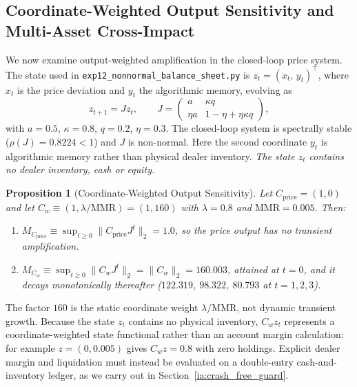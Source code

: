 \documentclass[12pt]{article}
\newtheorem{proposition}[theorem]{Proposition}
\theoremstyle{definition}
\theoremstyle{remark}
\begin{document}
\subsection{Coordinate-Weighted Output Sensitivity and Multi-Asset Cross-Impact}
\label{ia:nonnormal_decoupling}

We now examine output-weighted amplification in the closed-loop price system. The state used in \texttt{exp12\_nonnormal\_balance\_sheet.py} is $z_t=(x_t,\,y_t)^\top$, where $x_t$ is the price deviation and $y_t$ the algorithmic memory, evolving as
\begin{equation}
z_{t+1} = J z_t, \qquad J = \begin{pmatrix} a & \kappa q \\ \eta a & 1-\eta+\eta\kappa q \end{pmatrix},
\end{equation}
with $a=0.5$, $\kappa=0.8$, $q=0.2$, $\eta=0.3$. The closed-loop system is spectrally stable ($\rho(J)=0.8224<1$) and $J$ is non-normal. Here the second coordinate $y_t$ is algorithmic memory rather than physical dealer inventory. \emph{The state $z_t$ contains no dealer inventory, cash or equity.}

\begin{proposition}[Coordinate-Weighted Output Sensitivity]
\label{prop:balance_sheet_decoupling}
Let $C_{\mathrm{price}} = (1, 0)$ and let $C_w \equiv (1, \lambda/\mathrm{MMR}) = (1,160)$ with $\lambda=0.8$ and $\mathrm{MMR}=0.005$. Then:
\begin{enumerate}[label=(\roman*)]
\item $M_{C_{\mathrm{price}}} \equiv \sup_{t \ge 0} \|C_{\mathrm{price}} J^t\|_2 = 1.0$, so the price output has no transient amplification.
\item $M_{C_w} \equiv \sup_{t \ge 0} \|C_w J^t\|_2 = \|C_w\|_2 = 160.003$, attained at $t=0$, and it decays monotonically thereafter ($122.319$, $98.322$, $80.793$ at $t=1,2,3$).
\end{enumerate}
\end{proposition}

The factor $160$ is the static coordinate weight $\lambda/\mathrm{MMR}$, not dynamic transient growth. Because the state $z_t$ contains no physical inventory, $C_w z_t$ represents a coordinate-weighted state functional rather than an account margin calculation: for example $z=(0,0.005)$ gives $C_w z=0.8$ with zero holdings. Explicit dealer margin and liquidation must instead be evaluated on a double-entry cash-and-inventory ledger, as we carry out in Section~\ref{ia:crash_free_guard}.
\end{document}
